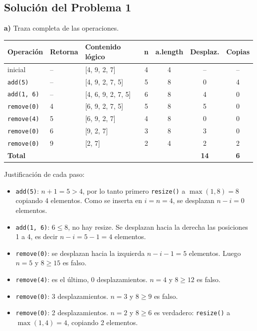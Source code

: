 \documentclass[11pt,a4paper]{article}
\begin{document}
\subsection*{Solución del Problema 1}

\textbf{a)} Traza completa de las operaciones.

\begin{center}
\small
\begin{tabular}{lllcccc}
\toprule
\textbf{Operación} & \textbf{Retorna} & \textbf{Contenido lógico} & \textbf{n} & \textbf{a.length} & \textbf{Desplaz.} & \textbf{Copias} \\
\midrule
inicial & -- & [4, 9, 2, 7] & 4 & 4 & -- & -- \\
\texttt{add(5)} & -- & [4, 9, 2, 7, 5] & 5 & 8 & 0 & 4 \\
\texttt{add(1, 6)} & -- & [4, 6, 9, 2, 7, 5] & 6 & 8 & 4 & 0 \\
\texttt{remove(0)} & 4 & [6, 9, 2, 7, 5] & 5 & 8 & 5 & 0 \\
\texttt{remove(4)} & 5 & [6, 9, 2, 7] & 4 & 8 & 0 & 0 \\
\texttt{remove(0)} & 6 & [9, 2, 7] & 3 & 8 & 3 & 0 \\
\texttt{remove(0)} & 9 & [2, 7] & 2 & 4 & 2 & 2 \\
\midrule
\textbf{Total} & & & & & \textbf{14} & \textbf{6} \\
\bottomrule
\end{tabular}
\end{center}

Justificación de cada paso:
\begin{itemize}[itemsep=1pt]
\item \texttt{add(5)}: $n + 1 = 5 > 4$, por lo tanto primero \texttt{resize()} a $\max(1, 8) = 8$ copiando 4 elementos. Como se inserta en $i = n = 4$, se desplazan $n - i = 0$ elementos.
\item \texttt{add(1, 6)}: $6 \le 8$, no hay resize. Se desplazan hacia la derecha las posiciones 1 a 4, es decir $n - i = 5 - 1 = 4$ elementos.
\item \texttt{remove(0)}: se desplazan hacia la izquierda $n - i - 1 = 5$ elementos. Luego $n = 5$ y $8 \ge 15$ es falso.
\item \texttt{remove(4)}: es el último, 0 desplazamientos. $n = 4$ y $8 \ge 12$ es falso.
\item \texttt{remove(0)}: 3 desplazamientos. $n = 3$ y $8 \ge 9$ es falso.
\item \texttt{remove(0)}: 2 desplazamientos. $n = 2$ y $8 \ge 6$ es verdadero: \texttt{resize()} a $\max(1, 4) = 4$, copiando 2 elementos.
\end{itemize}
\end{document}
